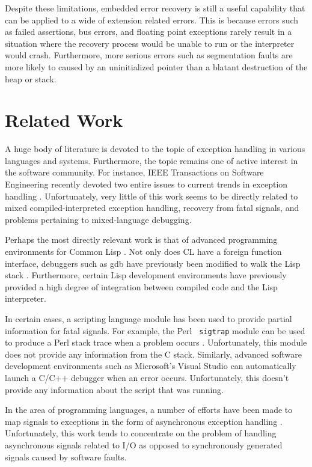 Despite these limitations, embedded error recovery is still a useful
capability that can be applied to a wide of extension related errors.
This is because errors such as failed assertions, bus errors, and
floating point exceptions rarely result in a situation where the
recovery process would be unable to run or the interpreter would
crash. Furthermore, more serious errors such as segmentation faults
are more likely to caused by an uninitialized pointer than a blatant
destruction of the heap or stack.

\section{Related Work}

A huge body of literature is devoted to the topic of exception
handling in various languages and systems.  Furthermore, the topic
remains one of active interest in the software community. For
instance, IEEE Transactions on Software Engineering recently devoted
two entire issues to current trends in exception handling
\cite{except1,except2}.  Unfortunately, very little of this work seems
to be directly related to mixed compiled-interpreted exception
handling, recovery from fatal signals, and problems pertaining to 
mixed-language debugging.

Perhaps the most directly relevant work is that of advanced programming 
environments for Common Lisp \cite{lisp}.  Not only does CL have a foreign function interface,
debuggers such as gdb have previously been modified to walk the Lisp stack
\cite{ffi,wcl}.  Furthermore, certain Lisp development environments have
previously provided a high degree of integration between compiled code and
the Lisp interpreter\cite{gabriel}.

In certain cases, a scripting language module has been used to provide
partial information for fatal signals. For example, the Perl {\tt
sigtrap} module can be used to produce a Perl stack trace when a
problem occurs \cite{perl}.  Unfortunately, this module does not
provide any information from the C stack.   Similarly, advanced software development
environments such as Microsoft's Visual Studio can automatically launch a C/C++ 
debugger when an error occurs.  Unfortunately, this doesn't provide any information
about the script that was running.

In the area of programming languages, a number of efforts have been made to
map signals to exceptions in the form of asynchronous exception handling 
\cite{buhr,ml,haskell}.  Unfortunately, this work tends to 
concentrate on the problem of handling asynchronous signals related to I/O as opposed
to synchronously generated signals caused by software faults.

